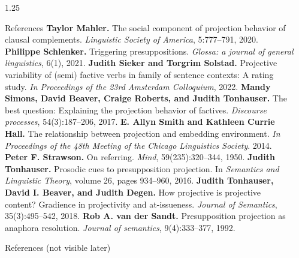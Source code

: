 \documentclass[final]{beamer}
\newlength{\sepwidth}
\newlength{\colwidth}
\newcommand{\separatorcolumn}{\begin{column}{\sepwidth}\end{column}}
\begin{document}
\begin{frame}[t]
\begin{columns}[t]
\begin{column}{1.25\colwidth}
\begin{normalbox}{References}
				\textbf{Taylor Mahler.} The social component of projection behavior of clausal complements. \textit{Linguistic Society of America}, 5:777–791, 2020. \quad \textbullet \quad
				\textbf{Philippe Schlenker.} Triggering presuppositions. \textit{Glossa: a journal of general linguistics}, 6(1), 2021. \quad \textbullet \quad
				\textbf{Judith Sieker and Torgrim Solstad.} Projective variability of (semi) factive verbs in family of sentence contexts: A rating study. \textit{In Proceedings of the 23rd Amsterdam Colloquium}, 2022. \quad \textbullet \quad
				\textbf{Mandy Simons, David Beaver, Craige Roberts, and Judith Tonhauser.} The best question: Explaining the projection behavior of factives. \textit{Discourse processes}, 54(3):187–206, 2017. \quad \textbullet \quad
				\textbf{E. Allyn Smith and Kathleen Currie Hall.} The relationship between projection and embedding environment. \textit{In Proceedings of the 48th Meeting of the Chicago Linguistics Society}. 2014. \quad \textbullet \quad
				\textbf{Peter F. Strawson.} On referring. \textit{Mind}, 59(235):320–344, 1950. \quad \textbullet \quad
				\textbf{Judith Tonhauser.} Prosodic cues to presupposition projection. In \textit{Semantics and Linguistic Theory}, volume 26, pages 934–960, 2016. \quad \textbullet \quad
				\textbf{Judith Tonhauser, David I. Beaver, and Judith Degen.} How projective is projective content? Gradience in projectivity and at-issueness. \textit{Journal of Semantics}, 35(3):495–542, 2018. \quad \textbullet \quad
				\textbf{Rob A. van der Sandt.} Presupposition projection as anaphora resolution. \textit{Journal of semantics}, 9(4):333–377, 1992.

			\end{normalbox}

			\begin{normalbox}{References (not visible later)}
				
				
			\end{normalbox}

		\end{column}
		\separatorcolumn
	\end{columns}



\end{frame}
\end{document}
